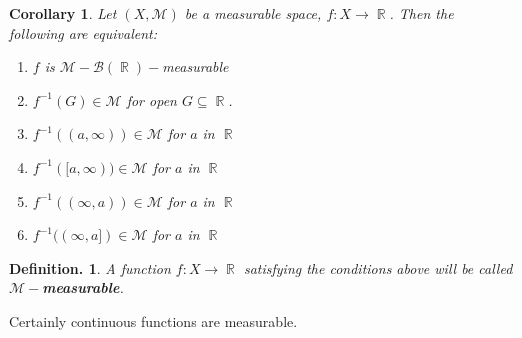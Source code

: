 \documentclass[12pt, a4paper]{memoir}
\DeclareMathOperator{\R}{{\mathbb{R}}}
\newtheorem{corollary}[theorem]{Corollary}
\theoremstyle{nonumberplain}
\newtheorem{definition}{Definition.}
\begin{document}
\begin{corollary}
    Let $(X,\mathcal{M})$ be a measurable space, $f:X\to\R$.
    Then the following are equivalent:
    \begin{enumerate}
        \item $f$ is $\mathcal{M}-\mathcal{B}(\R)-$measurable
        \item $f^{-1}(G)\in\mathcal{M}$ for open $G\subseteq\R$.
        \item $f^{-1}((a,\infty))\in\mathcal{M}$ for $a$ in $\R$
        \item $f^{-1}([a,\infty))\in\mathcal{M}$ for $a$ in $\R$
        \item $f^{-1}((\infty,a))\in\mathcal{M}$ for $a$ in $\R$
        \item $f^{-1}((\infty,a])\in\mathcal{M}$ for $a$ in $\R$ %
    \end{enumerate}
\end{corollary}
\begin{definition}
    A function $f:X\to\R$ satisfying the conditions above will be called $\mathcal{M}-$\textbf{measurable}.
\end{definition}
Certainly continuous functions are measurable.
\end{document}
